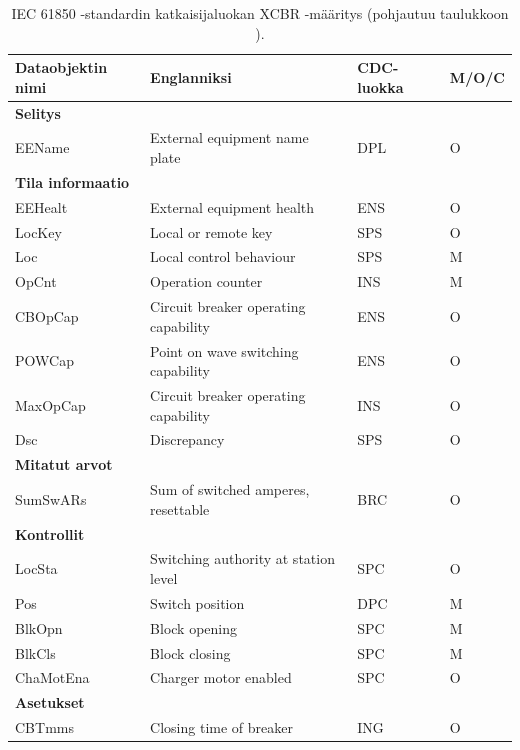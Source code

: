 \begin{table}[ht!]
	\caption{IEC 61850 -standardin katkaisijaluokan XCBR -määritys (pohjautuu taulukkoon \mbox{\cite[s.~105--106]{IEC61850-7-4}}).}
	\label{tab:iec61850-xcbr-class-definition}
	\begin{tabular}{l | l | l | l}
		\hline
		\textbf{Dataobjektin nimi} & \textbf{Englanniksi} & \textbf{CDC-luokka} & \textbf{M/O/C} \\
		\hline \hline
		\multicolumn{4}{l}{\textbf{Selitys}} \\
		\hline
		EEName & External equipment name plate & DPL & O \\
		\hline
		\multicolumn{4}{l}{\textbf{Tila informaatio}} \\
		\hline
		EEHealt & External equipment health & ENS & O \\
		LocKey & Local or remote key & SPS & O \\
		Loc & Local control behaviour & SPS & M \\
		OpCnt & Operation counter & INS & M \\
		CBOpCap & Circuit breaker operating capability & ENS & O \\
		POWCap & Point on wave switching capability & ENS & O \\
		MaxOpCap & Circuit breaker operating capability & INS & O \\
		Dsc & Discrepancy & SPS & O \\
		\hline
		\multicolumn{4}{l}{\textbf{Mitatut arvot}} \\
		\hline
		SumSwARs & Sum of switched amperes, resettable & BRC & O \\
		\hline
		\multicolumn{4}{l}{\textbf{Kontrollit}} \\
		\hline
		LocSta & Switching authority at station level & SPC & O \\
		Pos & Switch position & DPC & M \\
		BlkOpn & Block opening & SPC & M \\
		BlkCls & Block closing & SPC & M \\
		ChaMotEna & Charger motor enabled & SPC & O \\
		\hline
		\multicolumn{4}{l}{\textbf{Asetukset}} \\
		\hline
		CBTmms & Closing time of breaker & ING & O \\
		\hline
	\end{tabular}
\end{table}

